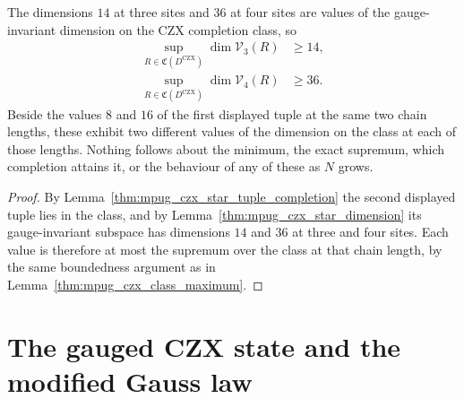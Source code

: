 \begin{lemma}
    \label{thm:mpug_czx_star_class_values}
    \leanok
    The dimensions $14$ at three sites and $36$ at four sites are values of the
    gauge-invariant dimension on the CZX completion class, so
    \begin{align}
        \sup_{R\in\mathfrak C(D^{\mathrm{CZX}})}\dim\mathcal V_3(R) & \geq14,
        \label{eq:mpug_czx_star_class_three}                                  \\
        \sup_{R\in\mathfrak C(D^{\mathrm{CZX}})}\dim\mathcal V_4(R) & \geq36.
        \label{eq:mpug_czx_star_class_four}
    \end{align}
    Beside the values $8$ and $16$ of the first displayed tuple at the same two
    chain lengths, these exhibit two different values of the dimension on the
    class at each of those lengths. Nothing follows about the minimum, the
    exact supremum, which completion attains it, or the behaviour of any of
    these as $N$ grows.
\end{lemma}

\begin{proof}\leanok
    By Lemma~\ref{thm:mpug_czx_star_tuple_completion} the second displayed
    tuple lies in the class, and by
    Lemma~\ref{thm:mpug_czx_star_dimension} its gauge-invariant subspace has
    dimensions $14$ and $36$ at three and four sites. Each value is therefore
    at most the supremum over the class at that chain length, by the same
    boundedness argument as in
    Lemma~\ref{thm:mpug_czx_class_maximum}.
\end{proof}

\section{The gauged CZX state and the modified Gauss law}
\label{sec:mpug_czx_gauged_state}


